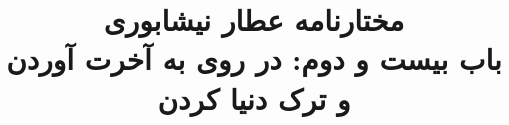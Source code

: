 \documentclass[14pt,b5paper]{article}
\begin{document}
\title{\Huge مختارنامه عطار نیشابوری \\
باب بیست و دوم: در روی به آخرت آوردن و ترک دنیا کردن}
\author{ }
\date{ }
\maketitle
\newpage
\tableofcontents
\newpage

\newpage

\newpage

\newpage

\newpage

\newpage

\newpage

\newpage

\newpage

\newpage

\newpage

\newpage

\newpage

\newpage

\newpage

\newpage

\newpage

\newpage

\newpage

\newpage

\newpage

\newpage

\newpage

\newpage

\newpage

\newpage

\newpage

\newpage

\newpage

\newpage

\newpage

\newpage

\newpage

\newpage

\newpage

\newpage
\end{document}
